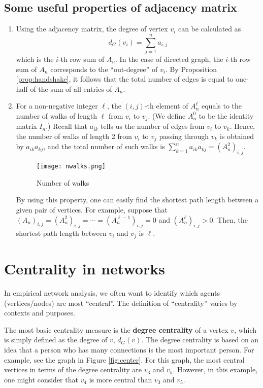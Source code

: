 \documentclass[11pt, A4paper, openany, uplatex]{book}
\begin{document}
\begin{appendices}
\subsection*{Some useful properties of adjacency matrix}

\begin{enumerate}
	\item Using the adjacency matrix, the degree of vertex $v_i$ can be calculated as
	\[
		d_G(v_i) = \sum_{j = 1}^n a_{i,j}
	\]
	which is the $i$-th row sum of $A_n$.
	In the case of directed graph, the $i$-th row sum of $A_n$ corresponds to the ``out-degree'' of $v_i$.
	By Proposition \ref{prop:handshake}, it follows that the total number of edges is equal to one-half of the sum of all entries of $A_n$.
	\item For a non-negative integer $\ell$, the $(i,j)$-th element of $A_n^\ell$ equals to the number of walks of length $\ell$ from $v_i$ to $v_j$. (We define $A_n^0$ to be the identity matrix $I_n$.)
	Recall that $a_{ik}$ tells us the number of edges from $v_i$ to $v_k$.
	Hence, the number of walks of length 2 from $v_i$ to $v_j$ passing through $v_k$ is obtained by $a_{ik}a_{kj}$, and the total number of such walks is $\sum_{k = 1}^n a_{ik}a_{kj} = (A_n^2)_{i,j}$.

	\begin{figure}[h!]
		\begin{center}
			\texttt{[image: nwalks.png]}
			\caption{Number of walks\label{fig:nwalks}}
		\end{center}
	\end{figure}

	By using this property, one can easily find the shortest path length between a given pair of vertices.
	For example, suppose that $ (A_n)_{i,j} =  (A_n^2)_{i,j} = \cdots =  (A_n^{\ell - 1})_{i,j} = 0$ and $(A_n^\ell)_{i,j} > 0$. 
	Then, the shortest path length between $v_i$ and $v_j$ is $\ell$.
\end{enumerate}

\section{Centrality in networks}
In empirical network analysis, we often want to identify which agents (vertices/nodes) are most ``central''.
The definition of ``centrality'' varies by contexts and purposes.

The most basic centrality measure is the \textbf{degree centrality} of a vertex $v$, which is simply defined as the degree of $v$, $d_G(v)$.
The degree centrality is based on an idea that a person who has many connections is the most important person.
For example, see the graph in Figure \ref{fig:center}.
For this graph, the most central vertices in terms of the degree centrality are $v_3$ and $v_5$.
However, in this example, one might consider that $v_4$ is more central than $v_3$ and $v_5$.


\end{appendices}
\end{document}
